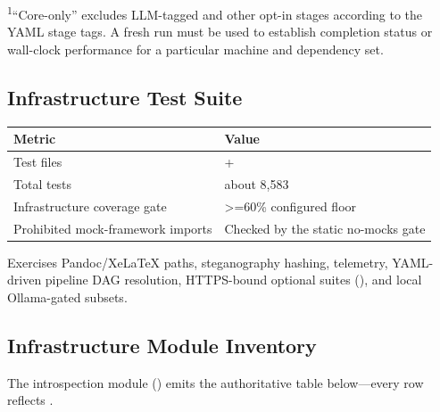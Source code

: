 \documentclass[
  english,
]{article}
\newcounter{none} %
\begin{document}
\texorpdfstring{\textsuperscript{1}}{1}``Core-only'' excludes LLM-tagged and other opt-in stages according to
the YAML stage tags. A fresh run must be used to establish completion
status or wall-clock performance for a particular machine and dependency
set.

\subsection{Infrastructure Test Suite}\label{infrastructure-test-suite}

{\def\LTcaptype{none} %
\begin{longtable}[]{@{}
  >{\raggedright\arraybackslash}p{}
  >{\raggedright\arraybackslash}p{}@{}}
\toprule\noalign{}
\begin{minipage}[b]{\linewidth}\raggedright
Metric
\end{minipage} & \begin{minipage}[b]{\linewidth}\raggedright
Value
\end{minipage} \\
\midrule\noalign{}
\endhead
\bottomrule\noalign{}
\endlastfoot
Test files & 504+ \\
Total tests & about 8,583 \\
Infrastructure coverage gate & \texorpdfstring{\textgreater{}=}{>=}60\% configured floor \\
Prohibited mock-framework imports & Checked by the static no-mocks
gate \\
\end{longtable}
}

Exercises Pandoc/XeLaTeX paths, steganography hashing, telemetry,
YAML-driven pipeline DAG resolution, HTTPS-bound optional suites
(), and local Ollama-gated subsets.

\subsection{Infrastructure Module
Inventory}\label{infrastructure-module-inventory}

The introspection module ()
emits the authoritative table below---every row reflects
.
\end{document}
